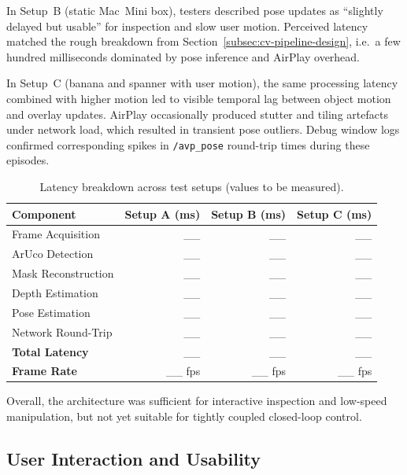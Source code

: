 In Setup~B (static Mac~Mini box), testers described pose updates as “slightly delayed but usable” for inspection and slow user motion. Perceived latency matched the rough breakdown from Section~\ref{subsec:cv-pipeline-design}, i.e.\ a few hundred milliseconds dominated by pose inference and AirPlay overhead.  

In Setup~C (banana and spanner with user motion), the same processing latency combined with higher motion led to visible temporal lag between object motion and overlay updates. AirPlay occasionally produced stutter and tiling artefacts under network load, which resulted in transient pose outliers. Debug window logs confirmed corresponding spikes in \texttt{/avp\_pose} round-trip times during these episodes.

\begin{table}[H]
    \centering
    \caption[Performance measurements across test setups]{Latency breakdown across test setups (values to be measured).}
    \label{fig:performanceplot}
    \begin{tabular}{lrrr}
        \toprule
        \textbf{Component} & \textbf{Setup A (ms)} & \textbf{Setup B (ms)} & \textbf{Setup C (ms)} \\
        \midrule
        Frame Acquisition       & \_\_     & \_\_     & \_\_ \\
        ArUco Detection         & \_\_     & \_\_     & \_\_ \\
        Mask Reconstruction     & \_\_     & \_\_     & \_\_ \\
        Depth Estimation        & \_\_     & \_\_     & \_\_ \\
        Pose Estimation         & \_\_     & \_\_     & \_\_ \\
        Network Round-Trip      & \_\_     & \_\_     & \_\_ \\
        \midrule
        \textbf{Total Latency}  & \_\_     & \_\_     & \_\_ \\
        \textbf{Frame Rate}     & \_\_ fps & \_\_ fps & \_\_ fps \\
        \bottomrule
    \end{tabular}
\end{table}

Overall, the architecture was sufficient for interactive inspection and low-speed manipulation, but not yet suitable for tightly coupled closed-loop control.

\subsection{User Interaction and Usability}

